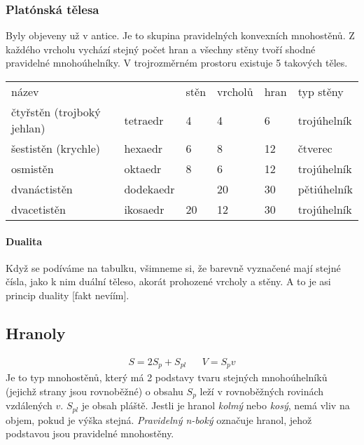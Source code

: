 \documentclass[12pt]{article}
\begin{document}
\subsubsection{Platónská tělesa}
Byly objeveny už v antice. Je to skupina pravidelných konvexních mnohostěnů. Z každého vrcholu vychází stejný počet hran a všechny stěny tvoří shodné pravidelné mnohoúhelníky. V trojrozměrném prostoru existuje 5 takových těles.
\begin{table}[]
\begin{tabular}{llllll}
název               &           & stěn                                              & vrcholů                    & hran                      & typ stěny   \\
čtyřstěn (trojboký jehlan)         & tetraedr  & \cellcolor[HTML]{9698ED}4                         & \cellcolor[HTML]{9698ED}4  & 6                         & trojúhelník \\
šestistěn (krychle) & hexaedr   & \cellcolor[HTML]{FFFE65}6                         & \cellcolor[HTML]{FD6864}8  & 12                        & čtverec     \\
osmistěn            & oktaedr   & \cellcolor[HTML]{FD6864}8                         & \cellcolor[HTML]{FFFE65}6  & {\color[HTML]{000000} 12} & trojúhelník \\
dvanáctistěn        & dodekaedr & \cellcolor[HTML]{96FFFB}{\color[HTML]{000000} 12} & \cellcolor[HTML]{67FD9A}20 & 30                        & pětiúhelník \\
dvacetistěn         & ikosaedr  & \cellcolor[HTML]{67FD9A}20                        & \cellcolor[HTML]{96FFFB}12 & 30                        & trojúhelník
\end{tabular}
\end{table}
\paragraph{Dualita}
Když se podíváme na tabulku, všimneme si, že barevně vyznačené mají stejné čísla, jako k nim duální těleso, akorát prohozené vrcholy a stěny. A to je asi princip duality [fakt nevíím].
\subsection{Hranoly}
\begin{align}
S = 2S_p + S_{pl} &&V = S_p v
\end{align}
Je to typ mnohostěnů, který má 2 podstavy tvaru stejných mnohoúhelníků (jejichž strany jsou rovnoběžné) o obsahu $S_p$ leží v rovnoběžných rovinách vzdálených $v$. $S_{pl}$ je obsah pláště. Jestli je hranol \emph{kolmý} nebo \emph{kosý}, nemá vliv na objem, pokud je výška stejná. \emph{Pravidelný n-boký} označuje hranol, jehož podstavou jsou pravidelné mnohostěny. 
\end{document}
